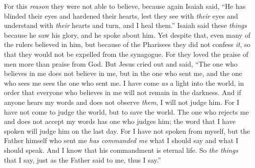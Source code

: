 \begin{biblechapter}
\verse For this \textit{reason} they were not able to believe, because again Isaiah said,
\verse “He has blinded their eyes 
and hardened their hearts, 
lest they see with \textit{their} eyes 
and understand with \textit{their} hearts 
and turn, and I heal them.”
\verse Isaiah said these \textit{things} because he saw his glory, and he spoke about him.
\verse Yet despite that, even many of the rulers believed in him, but because of the Pharisees they did not confess \textit{it}, so that they would not be expelled from the synagogue.
\verse For they loved the praise of men more than praise from God.
 But Jesus cried out and said, “The one who believes in me does not believe in me, but in the one who sent me,
\verse and the one who sees me sees the one who sent me.
\verse I have come \textit{as} a light into the world, in order that everyone who believes in me will not remain in the darkness.
\verse And if anyone hears my words and does not observe \textit{them}, I will not judge him. For I have not come to judge the world, but to save the world.
\verse The one who rejects me and does not accept my words has one who judges him; the word that I have spoken will judge him on the last day.
\verse For I have not spoken from myself, but the Father himself who sent me \textit{has commanded me} what I should say and what I should speak.
\verse And I know that his commandment is eternal life. So \textit{the things} that I say, just as the Father said to me, thus I say.”
\end{biblechapter}

